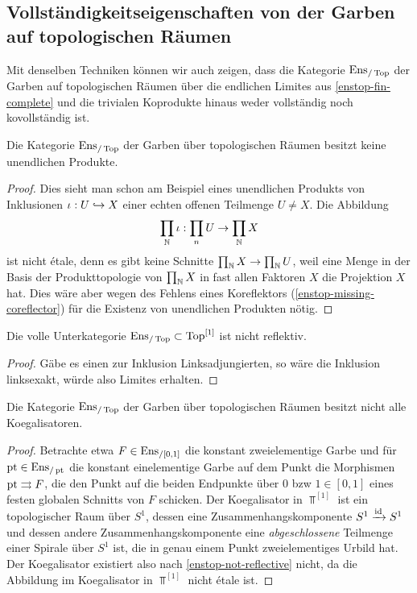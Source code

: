 \subsection{Vollständigkeitseigenschaften von der Garben auf topologischen Räumen}

Mit denselben Techniken können wir auch zeigen, dass die Kategorie
$\operatorname{Ens}_{/\operatorname{Top}}$ der Garben auf topologischen Räumen über die endlichen
Limites aus \ref{enstop-fin-complete} und die trivialen Koprodukte
hinaus weder vollständig noch kovollständig ist.

\begin{prop} \label{enstop-not-complete}
  Die Kategorie $\operatorname{Ens}_{/\operatorname{Top}}$ der Garben über topologischen Räumen besitzt
  keine unendlichen Produkte.
\end{prop}
\begin{proof}
  Dies sieht man schon am Beispiel eines unendlichen Produkts von
  Inklusionen $\iota: U \hookrightarrow X$ einer echten offenen Teilmenge $U \neq
  X$. Die Abbildung
  \[ \prod_{\mathbb{N}} \iota: \prod_n U \to \prod_{\mathbb{N}} X \]
  ist nicht étale, denn es gibt keine Schnitte $\prod_{\mathbb{N}} X \to
  \prod_{\mathbb{N}} U$, weil eine Menge in der Basis der Produkttopologie von
  $\prod_{\mathbb{N}} X$ in fast allen Faktoren $X$ die Projektion $X$ hat. Dies
  wäre aber wegen des Fehlens eines Koreflektors
  (\ref{enstop-missing-coreflector}) für die Existenz von unendlichen
  Produkten nötig.
\end{proof}
\begin{kor} \label{enstop-not-reflective}
  Die volle Unterkategorie $\operatorname{Ens}_{/\operatorname{Top}} \subset \operatorname{Top}^{[1]}$ ist nicht
  reflektiv.
\end{kor}
\begin{proof}
  Gäbe es einen zur Inklusion Linksadjungierten, so wäre die Inklusion
  linksexakt, würde also Limites erhalten.
\end{proof}
\begin{prop} \label{enstop-no-coequalizers}
  Die Kategorie $\operatorname{Ens}_{/\operatorname{Top}}$ der Garben über topologischen Räumen besitzt
  nicht alle Koegalisatoren.
\end{prop}
\begin{proof}
  Betrachte etwa $F \in \operatorname{Ens}_{/[0,1]}$ die konstant zweielementige
  Garbe und für $\operatorname{pt} \in \operatorname{Ens}_{/\operatorname{pt}}$ die konstant einelementige
  Garbe auf dem Punkt die Morphismen $\operatorname{pt} \rightrightarrows F$, die
  den Punkt auf die beiden Endpunkte über $0$ bzw $1 \in [0, 1]$ eines
  festen globalen Schnitts von $F$ schicken. Der Koegalisator in
  $\Top^{[1]}$ ist ein topologischer Raum über $S^1$, dessen eine
  Zusammenhangskomponente $S^1 \xrightarrow{\operatorname{id}} S^1$ und dessen
  andere Zusammenhangskomponente eine \emph{abgeschlossene} Teilmenge
  einer Spirale über $S^1$ ist, die in genau einem Punkt
  zweielementiges Urbild hat. Der Koegalisator existiert also nach
  \ref{enstop-not-reflective} nicht, da die Abbildung im Koegalisator
  in $\Top^{[1]}$ nicht étale ist.
\end{proof}


